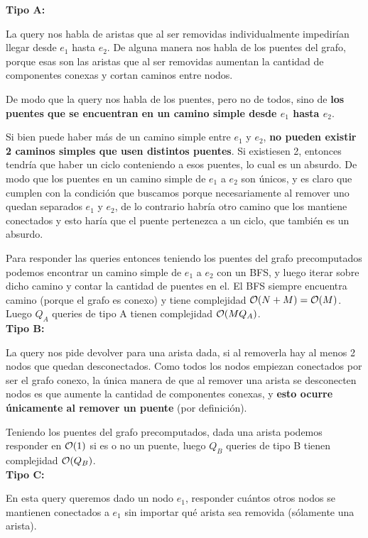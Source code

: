 \textbf{Tipo A:}

La query nos habla de aristas que al ser removidas individualmente 
impedirían llegar desde $e_1$ hasta $e_2$. De alguna manera nos habla de los puentes 
del grafo, porque esas son las aristas que al ser removidas aumentan la cantidad de 
componentes conexas y cortan caminos entre nodos. 

De modo que la query nos habla de los 
puentes, pero no de todos, sino de \textbf{los puentes que se encuentran 
en un camino simple desde $e_1$ hasta $e_2$}. 

Si bien puede haber más de un camino simple entre $e_1$ y $e_2$, \textbf{no pueden 
existir 2 caminos simples que usen distintos puentes}. Si existiesen 2, entonces 
tendría que haber un ciclo conteniendo a esos puentes, lo cual es un absurdo. 
De modo que los puentes en un camino simple de $e_1$ a $e_2$ son únicos, y es 
claro que cumplen con la condición que buscamos porque necesariamente al remover 
uno quedan separados $e_1$ y $e_2$, de lo contrario habría otro camino que los 
mantiene conectados y esto haría que el puente pertenezca a un ciclo, que también 
es un absurdo. 

Para responder las queries entonces teniendo los puentes del grafo precomputados 
podemos encontrar un camino simple de $e_1$ a $e_2$ con un BFS, y luego 
iterar sobre dicho camino y contar la cantidad de puentes en el. El BFS 
siempre encuentra camino (porque el grafo es conexo) y tiene complejidad 
$\mathcal{O}(N+M) = \mathcal{O}(M)$. Luego $Q_A$ queries de tipo A tienen complejidad 
$\mathcal{O}(MQ_A)$. \\

\textbf{Tipo B:}

La query nos pide devolver para una arista dada, si al 
removerla hay al menos 2 nodos que quedan desconectados. Como todos 
los nodos empiezan conectados por ser el grafo conexo, la única manera de que 
al remover una arista se desconecten nodos es que aumente la cantidad de componentes 
conexas, y \textbf{esto ocurre únicamente al remover un puente} (por definición). 

Teniendo los puentes del grafo precomputados, dada una arista podemos responder 
en $\mathcal{O}(1)$ si es o no un puente, luego $Q_B$ queries de tipo B tienen complejidad 
$\mathcal{O}(Q_B)$. \\

\textbf{Tipo C:}

En esta query queremos dado un nodo $e_1$, responder cuántos otros nodos 
se mantienen conectados a $e_1$ sin importar qué arista sea removida (sólamente una arista). 

